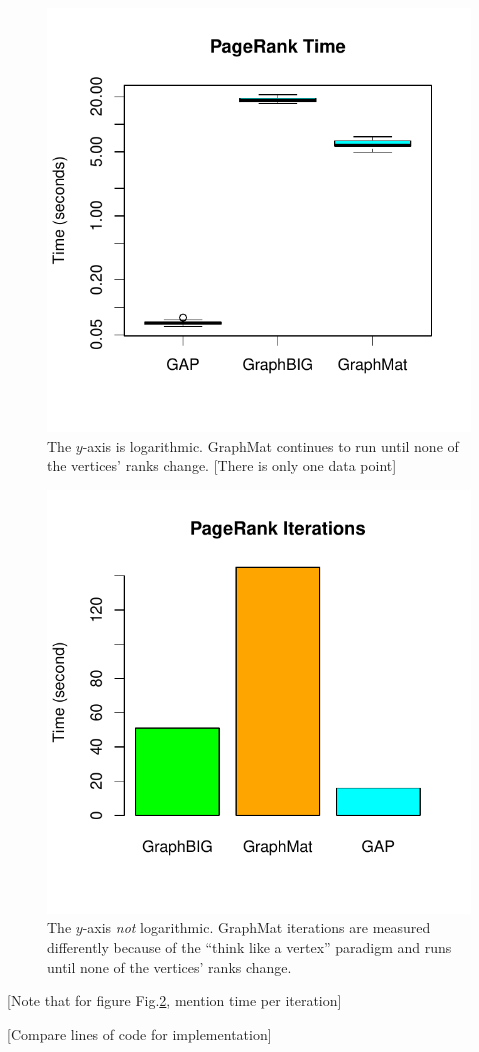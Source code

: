 \documentclass{llncs}
\begin{document}
\begin{figure}
	\centering
	\includegraphics[width=0.6\columnwidth, trim=0 36pt 18pt 0, clip]{graphics/pr_time.pdf}
	\caption{The $y$-axis is logarithmic. GraphMat continues to run until none of the vertices' ranks change. [There is only one data point]}
	\label{fig:pr-time}
\end{figure}

\begin{figure}
	\centering
	\includegraphics[width=0.6\columnwidth, trim=0 36pt 18pt 0, clip]{graphics/pr_iters.pdf}
	\caption{The $y$-axis \emph{not} logarithmic. GraphMat iterations are measured differently because of the ``think like a vertex'' paradigm and runs until none of the vertices' ranks change.}
	\label{fig:pr-iters}
\end{figure}
[Note that for figure Fig.\ref{fig:pr-iters}, mention time per iteration]

[Compare lines of code for implementation]
\end{document}
